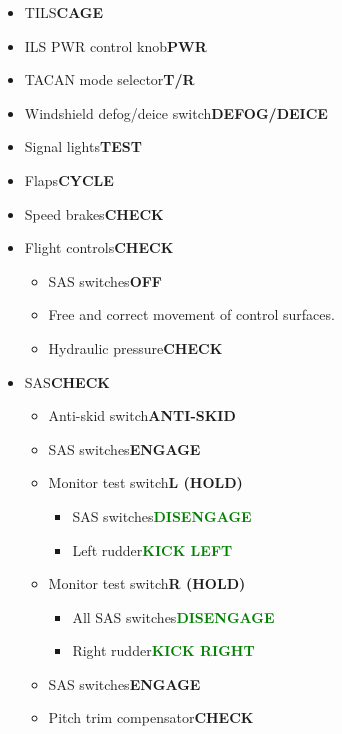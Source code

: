\documentclass[a4paper,12pt,dvipsnames]{letter}
\newcommand{\button}[1]{\textbf{#1}}
\newcommand{\ok}[1]{\textcolor{Green}{\textbf{#1}}}
\begin{document}
{\begin{itemize}
\begin{itemize}
  \item Jettison switch\dotfill\button{AFT}
  \item Mode switch\dotfill\button{STBY}
  \item Subsystem switches\dotfill\button{AS REQUIRED}
 \end{itemize}
 \item TILS\dotfill\button{CAGE}
 \item ILS PWR control knob\dotfill\button{PWR}
 \item TACAN mode selector\dotfill\button{T/R}
 \item Windshield defog/deice switch\dotfill\button{DEFOG/DEICE}
 \item Signal lights\dotfill\button{TEST}
 \item Flaps\dotfill\button{CYCLE}
 \item Speed brakes\dotfill\button{CHECK}
 \item Flight controls\dotfill\button{CHECK}
 \begin{itemize}
  \item SAS switches\dotfill\button{OFF}
  \item Free and correct movement of control surfaces.
  \item Hydraulic pressure\dotfill\button{CHECK}
 \end{itemize}
 \item SAS\dotfill\button{CHECK}
 \begin{itemize}
  \item Anti-skid switch\dotfill\button{ANTI-SKID}
  \item SAS switches\dotfill\button{ENGAGE}
  \item Monitor test switch\dotfill\button{L (HOLD)}
  \begin{itemize}
   \item SAS switches\dotfill\ok{DISENGAGE}
   \item Left rudder\dotfill\ok{KICK LEFT}
  \end{itemize}
  \item Monitor test switch\dotfill\button{R (HOLD)}
  \begin{itemize}
   \item All SAS switches\dotfill\ok{DISENGAGE}
   \item Right rudder\dotfill\ok{KICK RIGHT}
  \end{itemize}
  \item SAS switches\dotfill\button{ENGAGE}
  \item Pitch trim compensator\dotfill\button{CHECK}

\end{itemize}
\end{itemize}}
\end{document}
